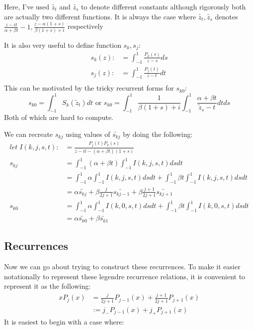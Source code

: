 \documentclass{article}
\begin{document}
Here, I've used $\tilde{z_t}$ and $\tilde{z_s}$ to denote different constants although rigorously both are actually two different functions.
It is always the case where $\tilde{z_t}, \tilde{z_s}$ denotes
$\frac{z-it}{\alpha+\beta t}-1,\frac{z-\alpha(1+s)}{\beta(1+s)+i}$ respectively

It is also very useful to define function $s_k, s_j$:
\begin{align}
	s_k(z) :&= \int_{-1}^1\frac{P_k(s)}{z-s}ds \\ 
	s_j(z) :&= \int_{-1}^1\frac{P_j(t)}{z-t}dt \\ 
\end{align}
This can be motivated by the tricky recurrent forms for $s_{k0}$:
$$s_{k0} = \int_{-1}^1S_k(\tilde z_t)dt\text{ or } s_{k0} = \int_{-1}^1\frac{1}{\beta(1+s)+i}\int_{-1}^1\frac{\alpha+\beta t}{\tilde z_s-t}dtds$$
Both of which are hard to compute.

We can recreate $s_{kj}$ using values of $\tilde{s_{kj}}$ by doing the following:
\begin{align}
	let\; I(k,j,s,t) :&= \frac{P_j(t)P_k(s)}{z-it-(\alpha+\beta t)(1+s)}\\ 
	s_{kj} &= \int_{-1}^1(\alpha+\beta t)\int_{-1}^1 I(k,j,s,t) dsdt\\
	&= \int_{-1}^1\alpha\int_{-1}^1 I(k,j,s,t)dsdt +
	\int_{-1}^1\beta t\int_{-1}^1 I(k,j,s,t) dsdt\\
	&= \alpha\tilde{s_{kj}} + \beta\frac{j}{2j+1}\tilde{s_{kj-1}} + \beta\frac{j+1}{2j+1}\tilde{s_{kj+1}} \\
	s_{k0} &= \int_{-1}^1\alpha\int_{-1}^1 I(k,0,s,t)dsdt +
	\int_{-1}^1\beta t\int_{-1}^1 I(k,0,s,t) dsdt \\
	&= \alpha\tilde{s_{k0}} + \beta\tilde{s_{k1}}
\end{align}

\subsection{Recurrences}

Now we can go about trying to construct these recurrences.
To make it easier notationally to represent these legendre recurrence relations, it is convenient to represent it as the following:
\begin{align}
    xP_j(x) &= \frac{j}{2j+1}P_{j-1}(x)+\frac{j+1}{2j+1}P_{j+1}(x) \\
    &:= j_-P_{j-1}(x)+j_+P_{j+1}(x)
\end{align}
It is easiest to begin with a case where:
\end{document}
